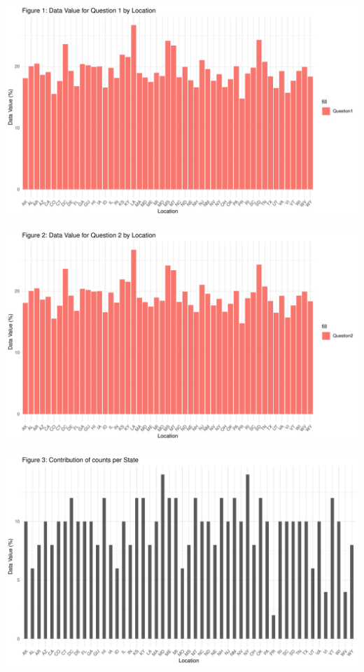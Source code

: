 \documentclass[
  letterpaper,
  DIV=11,
  numbers=noendperiod]{scrartcl}
\begin{document}
\includegraphics{PM566---Final_files/figure-pdf/unnamed-chunk-18-1.pdf}

\includegraphics{PM566---Final_files/figure-pdf/unnamed-chunk-19-1.pdf}

\includegraphics{PM566---Final_files/figure-pdf/unnamed-chunk-20-1.pdf}
\end{document}
